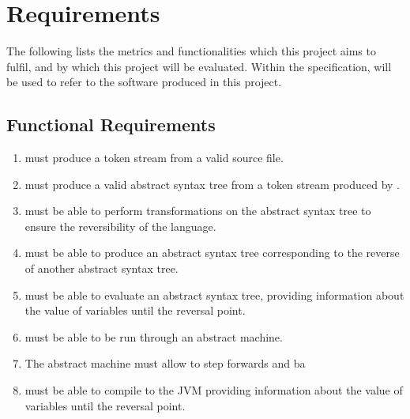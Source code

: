 \chapter{Requirements}

The following lists the metrics and functionalities which this project aims to fulfil, and by which this project will be evaluated.
Within the specification, \rimp will be used to refer to the software produced in this project.


\section{Functional Requirements}

\begin{enumerate}
    \item \rimp must produce a token stream from a valid \rimplang source file.
    \item \rimp must produce a valid abstract syntax tree from a token stream produced by \rimp.
    \item \rimp must be able to perform transformations on the abstract syntax tree to ensure the reversibility of the language.
    \item \rimp must be able to produce an abstract syntax tree corresponding to the reverse of another abstract syntax tree.
    \item \rimp must be able to evaluate an abstract syntax tree, providing information about the value of variables until the reversal point.
    \item \rimp must be able to be run through an abstract machine.
    \item The \rimp abstract machine must allow to step forwards and ba
    \item \rimp must be able to compile to the JVM providing information about the value of variables until the reversal point.
\end{enumerate}

